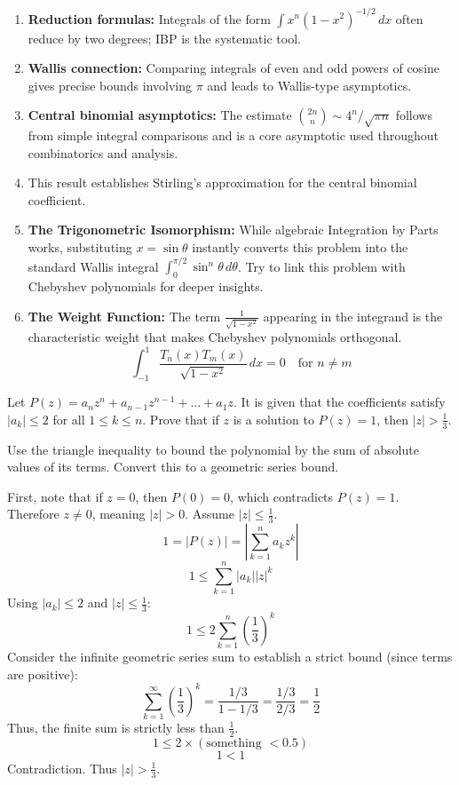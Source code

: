 \begin{takeaways}
\begin{enumerate}
    \item \textbf{Reduction formulas:} Integrals of the form $\int x^n(1-x^2)^{-1/2}\,dx$ often reduce by two degrees; IBP is the systematic tool.
    \item \textbf{Wallis connection:} Comparing integrals of even and odd powers of cosine gives precise bounds involving $\pi$ and leads to Wallis-type asymptotics.
    \item \textbf{Central binomial asymptotics:} The estimate $\binom{2n}{n}\sim 4^n/\sqrt{\pi n}$ follows from simple integral comparisons and is a core asymptotic used throughout combinatorics and analysis.
    \item This result establishes Stirling's approximation for the central binomial coefficient.
    \item \textbf{The Trigonometric Isomorphism:} 
    While algebraic Integration by Parts works, 
    substituting $x = \sin \theta$ instantly converts this problem into 
    the standard Wallis integral $\int_0^{\pi/2} \sin^n \theta \, d\theta$. 
    Try to link this problem with Chebyshev polynomials for deeper insights.
    \item \textbf{The Weight Function:} 
    The term $\frac{1}{\sqrt{1-x^2}}$ appearing in the integrand is the 
    characteristic weight that makes Chebyshev polynomials orthogonal.
    $$\int_{-1}^1 \frac{T_n(x) T_m(x)}{\sqrt{1-x^2}} \, dx = 0 \quad \text{for } n \neq m$$
\end{enumerate}
\end{takeaways}

\begin{problem}
Let $P(z) = a_n z^n + a_{n-1} z^{n-1} + \dots + a_1 z$.
It is given that the coefficients satisfy $|a_k| \le 2$ for all $1 \le k \le n$.
Prove that if $z$ is a solution to $P(z) = 1$, then $|z| > \frac{1}{3}$.
\end{problem}

\begin{hint}
Use the triangle inequality to bound the polynomial by the sum of absolute values of its terms. Convert this to a geometric series bound.
\end{hint}

\begin{solution}
First, note that if $z=0$, then $P(0) = 0$, which contradicts $P(z)=1$. Therefore $z \neq 0$, meaning $|z| > 0$.
Assume $|z| \le \frac{1}{3}$.
\[ 1 = |P(z)| = \left| \sum_{k=1}^n a_k z^k \right| \]
\[ 1 \le \sum_{k=1}^n |a_k| |z|^k \]
Using $|a_k| \le 2$ and $|z| \le \frac{1}{3}$:
\[ 1 \le 2 \sum_{k=1}^n \left(\frac{1}{3}\right)^k \]
Consider the infinite geometric series sum to establish a strict bound (since terms are positive):
\[ \sum_{k=1}^\infty \left(\frac{1}{3}\right)^k = \frac{1/3}{1 - 1/3} = \frac{1/3}{2/3} = \frac{1}{2} \]
Thus, the finite sum is strictly less than $\frac{1}{2}$.
\[ 1 \le 2 \times (\text{something } < 0.5) \]
\[ 1 < 1 \]
Contradiction. Thus $|z| > \frac{1}{3}$.
\end{solution}

